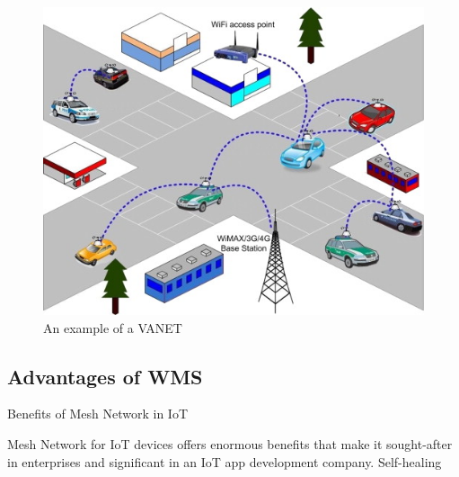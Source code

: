 		\begin{minipage}{0.48\textwidth}\raggedright
			\begin{figure}[H]
				\centering
				\includegraphics[width=\textwidth]{resources/img/chap4/vanet}
				\caption[An example of a VANET]{An example of a VANET\cite{BADIS2015653}}
				\label{img:vanet}
			\end{figure}
		\end{minipage}
	
		
		
	
	
	
	
		\subsection{Advantages of WMS}
		
			Benefits of Mesh Network in IoT
			
			Mesh Network for IoT devices offers enormous benefits that make it sought-after in enterprises and significant in an IoT app development company.
			Self-healing
			
